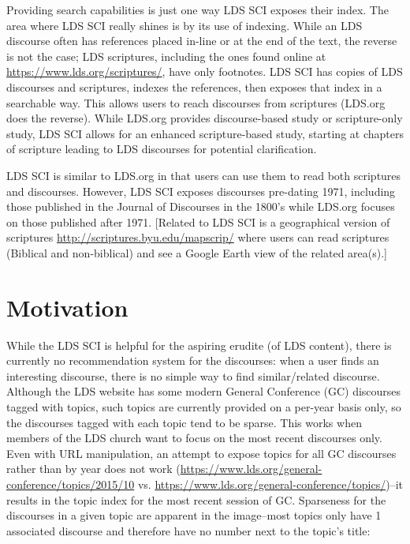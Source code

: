Providing search capabilities is just one way LDS SCI exposes their index. The area where LDS SCI really shines is by its use of indexing. While an LDS discourse often has references placed in-line or at the end of the text, the reverse is not the case; LDS scriptures, including the ones found online at \url{https://www.lds.org/scriptures/}, have only footnotes. LDS SCI has copies of LDS discourses and scriptures, indexes the references, then exposes that index in a searchable way. This allows users to reach discourses from scriptures (LDS.org does the reverse). While LDS.org provides discourse-based study or scripture-only study, LDS SCI allows for an enhanced scripture-based study, starting at chapters of scripture leading to LDS discourses for potential clarification.

LDS SCI is similar to LDS.org in that users can use them to read both scriptures and discourses. However, LDS SCI exposes discourses pre-dating 1971, including those published in the Journal of Discourses in the 1800’s while LDS.org focuses on those published after 1971. [Related to LDS SCI is a geographical version of scriptures \url{http://scriptures.byu.edu/mapscrip/} where users can read scriptures (Biblical and non-biblical) and see a Google Earth view of the related area(s).]

\section{Motivation}
While the LDS SCI is helpful for the aspiring erudite (of LDS content), there is currently no recommendation system for the discourses: when a user finds an interesting discourse, there is no simple way to find similar/related discourse. Although the LDS website has some modern General Conference (GC) discourses tagged with topics, such topics are currently provided on a per-year basis only, so the discourses tagged with each topic tend to be sparse. This works when members of the LDS church want to focus on the most recent discourses only. Even with URL manipulation, an attempt to expose topics for all GC discourses rather than by year does not work (\url{https://www.lds.org/general-conference/topics/2015/10} vs. \url{https://www.lds.org/general-conference/topics/})--it results in the topic index for the most recent session of GC. Sparseness for the discourses in a given topic are apparent in the image--most topics only have 1 associated discourse and therefore have no number next to the topic’s title:

